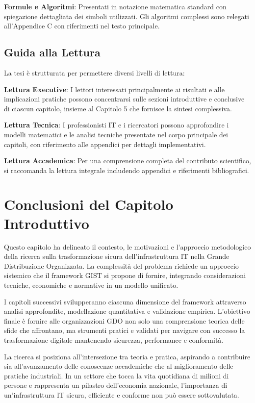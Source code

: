 \textbf{Formule e Algoritmi}: Presentati in notazione matematica standard con spiegazione dettagliata dei simboli utilizzati. Gli algoritmi complessi sono relegati all'Appendice C con riferimenti nel testo principale.

\subsection{Guida alla Lettura}

La tesi è strutturata per permettere diversi livelli di lettura:

\textbf{Lettura Executive}: I lettori interessati principalmente ai risultati e alle implicazioni pratiche possono concentrarsi sulle sezioni introduttive e conclusive di ciascun capitolo, insieme al Capitolo 5 che fornisce la sintesi complessiva.

\textbf{Lettura Tecnica}: I professionisti IT e i ricercatori possono approfondire i modelli matematici e le analisi tecniche presentate nel corpo principale dei capitoli, con riferimento alle appendici per dettagli implementativi.

\textbf{Lettura Accademica}: Per una comprensione completa del contributo scientifico, si raccomanda la lettura integrale includendo appendici e riferimenti bibliografici.

\section{Conclusioni del Capitolo Introduttivo}

Questo capitolo ha delineato il contesto, le motivazioni e l'approccio metodologico della ricerca sulla trasformazione sicura dell'infrastruttura IT nella Grande Distribuzione Organizzata. La complessità del problema richiede un approccio sistemico che il framework GIST si propone di fornire, integrando considerazioni tecniche, economiche e normative in un modello unificato.

I capitoli successivi svilupperanno ciascuna dimensione del framework attraverso analisi approfondite, modellazione quantitativa e validazione empirica. L'obiettivo finale è fornire alle organizzazioni GDO non solo una comprensione teorica delle sfide che affrontano, ma strumenti pratici e validati per navigare con successo la trasformazione digitale mantenendo sicurezza, performance e conformità.

La ricerca si posiziona all'intersezione tra teoria e pratica, aspirando a contribuire sia all'avanzamento delle conoscenze accademiche che al miglioramento delle pratiche industriali. In un settore che tocca la vita quotidiana di milioni di persone e rappresenta un pilastro dell'economia nazionale, l'importanza di un'infrastruttura IT sicura, efficiente e conforme non può essere sottovalutata.

